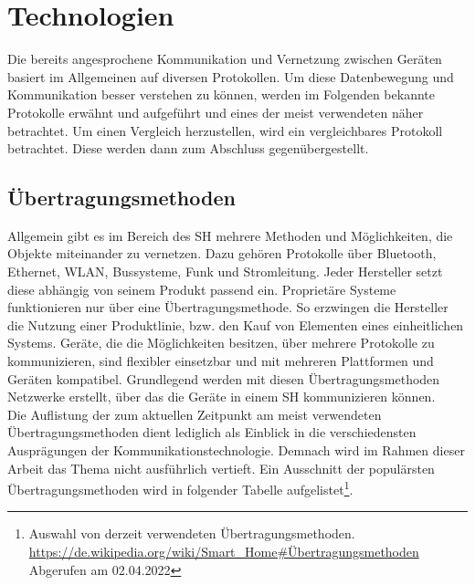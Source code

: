 \section{Technologien}
\label{sec:technologien}
    Die bereits angesprochene Kommunikation und Vernetzung zwischen Geräten basiert im Allgemeinen auf 
    diversen Protokollen. Um diese Datenbewegung und Kommunikation besser verstehen zu können, werden im 
    Folgenden bekannte Protokolle erwähnt und aufgeführt und eines der meist verwendeten näher betrachtet. 
    Um einen Vergleich herzustellen, wird ein vergleichbares Protokoll betrachtet. Diese werden dann zum 
    Abschluss gegenübergestellt. 

    \subsection{Übertragungsmethoden}
    \label{subsec:netzwerkprotokolle}
    Allgemein gibt es im Bereich des \acl{SH} mehrere Methoden und Möglichkeiten, die Objekte miteinander zu vernetzen. 
    Dazu gehören Protokolle über Bluetooth, Ethernet, WLAN, Bussysteme, Funk und Stromleitung. 
    Jeder Hersteller setzt diese abhängig von seinem Produkt passend ein. Proprietäre Systeme funktionieren nur über eine 
    Übertragungsmethode. So erzwingen die Hersteller die Nutzung einer Produktlinie, bzw. den Kauf von Elementen eines 
    einheitlichen Systems. Geräte, die die Möglichkeiten besitzen, über mehrere Protokolle 
    zu kommunizieren, sind flexibler einsetzbar und mit mehreren Plattformen und Geräten kompatibel.
    Grundlegend werden mit diesen Übertragungsmethoden Netzwerke erstellt, über das die Geräte in einem \acl{SH} kommunizieren können.
    \\
    \linebreak    
    Die Auflistung der zum aktuellen Zeitpunkt am meist verwendeten Übertragungsmethoden dient 
    lediglich als Einblick in die verschiedensten Ausprägungen der Kommunikationstechnologie.   
    Demnach wird im Rahmen dieser Arbeit das Thema nicht ausführlich vertieft.
    Ein Ausschnitt der populärsten Übertragungsmethoden wird in folgender Tabelle aufgelistet\footnote{Auswahl von derzeit verwendeten Übertragungsmethoden. \url{https://de.wikipedia.org/wiki/Smart_Home\#Übertragungsmethoden} Abgerufen am 02.04.2022}. 

